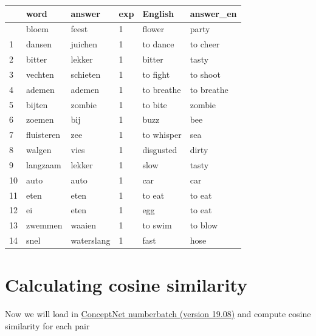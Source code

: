 \documentclass[
  letterpaper,
  DIV=11,
  numbers=noendperiod]{scrreprt}
\begin{document}
\begin{longtable}[]{@{}llllll@{}}
\toprule\noalign{}
& word & answer & exp & English & answer\_en \\
\midrule\noalign{}
\endhead
\bottomrule\noalign{}
\endlastfoot
0 & bloem & feest & 1 & flower & party \\
1 & dansen & juichen & 1 & to dance & to cheer \\
2 & bitter & lekker & 1 & bitter & tasty \\
3 & vechten & schieten & 1 & to fight & to shoot \\
4 & ademen & ademen & 1 & to breathe & to breathe \\
5 & bijten & zombie & 1 & to bite & zombie \\
6 & zoemen & bij & 1 & buzz & bee \\
7 & fluisteren & zee & 1 & to whisper & sea \\
8 & walgen & vies & 1 & disgusted & dirty \\
9 & langzaam & lekker & 1 & slow & tasty \\
10 & auto & auto & 1 & car & car \\
11 & eten & eten & 1 & to eat & to eat \\
12 & ei & eten & 1 & egg & to eat \\
13 & zwemmen & waaien & 1 & to swim & to blow \\
14 & snel & waterslang & 1 & fast & hose \\
\end{longtable}


\chapter{Calculating cosine
similarity}\label{calculating-cosine-similarity}

Now we will load in
\href{https://github.com/commonsense/conceptnet-numberbatch}{ConceptNet
numberbatch (version 19.08)} and compute cosine similarity for each pair
\end{document}
